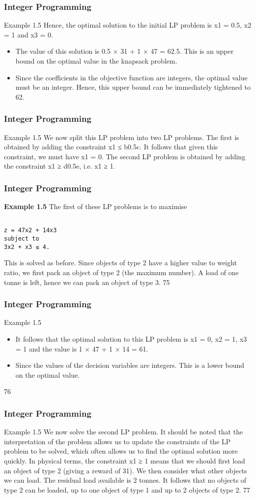\begin{frame} 
\frametitle{Integer Programming}     
Example 1.5
Hence, the optimal solution to the initial LP problem is x1 = 0.5,
x2 = 1 and x3 = 0.
\begin{itemize}
	\item The value of this solution is 0.5 × 31 + 1 × 47 = 62.5.
	This is an upper bound on the optimal value in the knapsack
	problem.
	\item Since the coefficients in the objective function are integers, the
	optimal value must be an integer. Hence, this upper bound can be
	immediately tightened to 62.
\end{itemize}

\end{frame}  
\begin{frame} 
\frametitle{Integer Programming}     
Example 1.5
We now split this LP problem into two LP problems.
The first is obtained by adding the constraint x1 ≤ b0.5c. It follows
that given this constraint, we must have x1 = 0.
The second LP problem is obtained by adding the constraint
x1 ≥ d0.5e, i.e. x1 ≥ 1.
\end{frame}  
\begin{frame}[fragile] 
\frametitle{Integer Programming}     
\textbf{Example 1.5}
The first of these LP problems is to maximise
\begin{verbatim}

z = 47x2 + 14x3
subject to
3x2 + x3 ≤ 4.
\end{verbatim}
This is solved as before. Since objects of type 2 have a higher
value to weight ratio, we first pack an object of type 2 (the
maximum number).
A load of one tonne is left, hence we can pack an object of type 3.
75 
\end{frame}  
\begin{frame} 
\frametitle{Integer Programming}     
Example 1.5
\begin{itemize}
	\item It follows that the optimal solution to this LP problem is
	x1 = 0, x2 = 1, x3 = 1 and the value is 1 × 47 + 1 × 14 = 61.
	\item Since the values of the decision variables are integers. This is a
	lower bound on the optimal value.
\end{itemize}

76 
\end{frame} 
\begin{frame} 
\frametitle{Integer Programming}     
Example 1.5
We now solve the second LP problem. It should be noted that the
interpretation of the problem allows us to update the constraints of
the LP problem to be solved, which often allows us to find the
optimal solution more quickly.
In physical terms, the constraint x1 ≥ 1 means that we should first
load an object of type 2 (giving a reward of 31).
We then consider what other objects we can load.
The residual load available is 2 tonnes. It follows that no objects of
type 2 can be loaded, up to one object of type 1 and up to 2
objects of type 2.
77 
\end{frame} 
